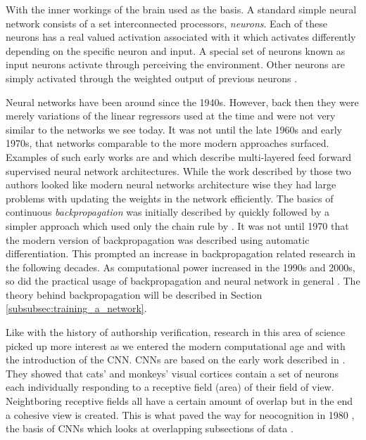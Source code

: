 With the inner workings of the brain used as the basis. A standard simple neural
network consists of a set interconnected processors, \textit{neurons}. Each of
these neurons has a real valued activation associated with it which activates
differently depending on the specific neuron and input. A special set of neurons
known as input neurons activate through perceiving the environment. Other
neurons are simply activated through the weighted output of previous neurons
\citep{DBLP:journals/corr/Schmidhuber14}.

Neural networks have been around since the 1940s. However, back then they
were merely variations of the linear regressors used at the time and were
not very similar to the networks we see today. It was not until the late
1960s and early 1970s, that networks comparable to the more modern approaches
surfaced. Examples of such early works are \citep{ivakhnenko1973cybernetic}
and \citep{4308320} which describe multi-layered feed forward supervised
neural network architectures. While the work described by those two authors
looked like modern neural networks architecture wise they had large problems
with updating the weights in the network efficiently. The basics of continuous
\textit{backpropagation} was initially described by \citet{Kelley1960}
quickly followed by a simpler approach which used only the chain rule
by \citet{DREYFUS196230}. It was not until 1970 that the modern version
of backpropagation was described using automatic differentiation. This
prompted an increase in backpropagation related research in the following
decades. As computational power increased in the 1990s and 2000s, so did
the practical usage of backpropagation and neural network in general
\citep{Schmidhuber:2015}. The theory behind backpropagation will be described in
Section \ref{subsubsec:training_a_network}.


Like with the history of authorship verification, research in this area of
science picked up more interest as we entered the modern computational age and
with the introduction of the \gls{CNN}. \glspl{CNN} are based on the early work
described in \citet{TJP:TJP19681951215}. They showed that cats' and monkeys'
visual cortices contain a set of neurons each individually responding to a
receptive field (area) of their field of view. Neightboring receptive fields
all have a certain amount of overlap but in the end a cohesive view is created.
This is what paved the way for neocognition in 1980 \citep{Fukushima1980},
the basis of \glspl{CNN} which looks at overlapping subsections of data
\citep{Schmidhuber:2015}.


